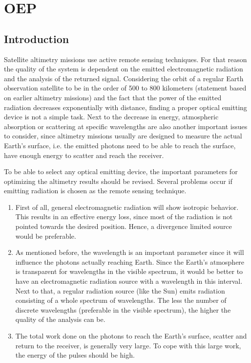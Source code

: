 \section{\acl{OEP}}
\label{designOptionsEmitter}
\subsection{Introduction}
Satellite altimetry missions use active remote sensing techniques. For that reason the quality of the system is dependent on the emitted electromagnetic radiation and the analysis of the returned signal. Considering the orbit of a regular Earth observation satellite to be in the order of 500 to 800 kilometers (statement based on earlier altimetry missions) and the fact that the power of the emitted radiation decreases exponentially with distance, finding a proper optical emitting device is not a simple task. Next to the decrease in energy, atmospheric absorption or scattering at specific wavelengths are also another important issues to consider, since altimetry missions usually are designed to measure the actual Earth's surface, i.e. the emitted photons need to be able to reach the surface, have enough energy to scatter and reach the receiver.

To be able to select any optical emitting device, the important parameters for optimizing the altimetry results should be revised. Several problems occur if emitting radiation is chosen as the remote sensing technique. 
\begin{enumerate}[i]
	\item First of all, general electromagnetic radiation will show isotropic behavior. This results in an effective energy loss, since most of the radiation is not pointed towards the desired position. Hence, a divergence limited source would be preferable.
	\item As mentioned before, the wavelength is an important parameter since it will influence the photons actually reaching Earth. Since the Earth's atmosphere is transparent for wavelengths in the visible spectrum, it would be better to have an electromagnetic radiation source with a wavelength in this interval. Next to that, a regular radiation source (like the Sun) emits radiation consisting of a whole spectrum of wavelengths. The less the number of discrete wavelengths (preferable in the visible spectrum), the higher the quality of the analysis can be.
	\item The total work done on the photons to reach the Earth's surface, scatter and return to the receiver, is generally very large. To cope with this large work, the energy of the pulses should be high.  
\end{enumerate}

